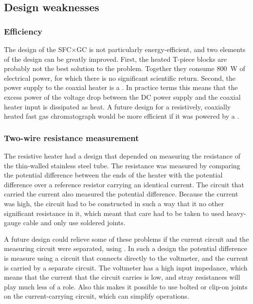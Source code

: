 \subsection{Design weaknesses}

\subsubsection{Efficiency}

The design of the SFC×GC is not particularly energy-efficient, and two elements
of the design can be greatly improved. First, the heated T-piece blocks are
probably not the best solution to the problem. Together they consume
\SI{800}{\watt} of electrical power, for which there is no significant
scientific return. Second, the power supply to the coaxial heater is a
. In practice terms this means that the excess
power of the voltage drop between the DC power supply and the coaxial heater
input is dissipated as heat. A future design for a resistively, coaxially heated
fast gas chromatograph would be more efficient if it was powered by a
.

\subsubsection{Two-wire resistance measurement}

The resistive heater had a design that depended on measuring the resistance of
the thin-walled stainless steel tube. The resistance was measured by comparing
the potential difference between the ends of the heater with the potential
difference over a reference resistor carrying an identical current. The circuit
that carried the current also measured the potential difference. Because the
current was high, the circuit had to be constructed in such a way that it no
other significant resistance in it, which meant that care had to be taken to  
used heavy-gauge cable and only use soldered joints. 

A future design could relieve some of these problems if the current circuit and
the measuring circuit were separated, using . In such a design the potential difference is measure using a
circuit that connects directly to the voltmeter, and the current is carried by a
separate circuit. The voltmeter has a high input impedance, which means that the
current that the circuit carries is low, and stray resistances will play much
less of a role. Also this makes it possible to use bolted or clip-on joints on
the current-carrying circuit, which can simplify operations.


